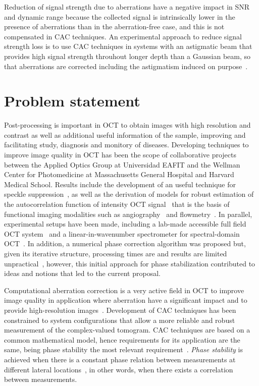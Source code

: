 Reduction of signal strength due to aberrations have a negative impact in SNR and dynamic range because the collected signal is intrinsically lower in the presence of aberrations than in the aberration-free case, and this is not compensated in CAC techniques. An experimental approach to reduce signal strength loss is to use CAC techniques in systems with an astigmatic beam that provides high signal strength throuhout longer depth than a Gaussian beam, so that aberrations are corrected including the astigmatism induced on purpose~\cite{Adie2012_Computational}.


\section{Problem statement}

Post-processing is important in OCT to obtain images with high resolution and contrast as well as additional useful information of the sample, improving and facilitating study, diagnosis and monitory of diseases. Developing techniques to improve image quality in OCT has been the scope of collaborative projects between the Applied Optics Group at Universidad EAFIT and the Wellman Center for Photomedicine at Massachusetts General Hospital and Harvard Medical School. Results include the development of an useful technique for speckle suppression~\cite{Cuartas-Velez2018_Volumetric}, as well as the derivation of models for robust estimation of the autocorrelation function of intensity OCT signal~\cite{Uribe-Patarroyo2020_Noise} that is the basis of functional imaging modalities such as angiography~\cite{Wang2007_Three} and flowmetry~\cite{Liu2013_Quantitative}. In parallel, experimental setups have been made, including a lab-made accessible full field OCT system~\cite{Cuartas-Velez2019_Labmade} and a linear-in-wavenumber spectrometer for spectral-domain OCT~\cite{Ruiz-Lopera2018_Design}. In addition, a numerical phase correction algorithm was proposed but, given its iterative structure, processing times are and results are limited unpractical~\cite{Cuartas-Velez2017_Formacion}, however, this initial approach for phase stabilization contributed to ideas and notions that led to the current proposal.

Computational aberration correction is a very active field in OCT to improve image quality in application where aberration have a significant impact and to provide high-resolution images~\cite{Adie2012_Computational, Hillmann2016_Aberrationfree, Kumar2017_Invivo}. Development of CAC techniques has been constrained to system configurations that allow a more reliable and robust measurement of the complex-valued tomogram. CAC techniques are based on a common mathematical model, hence requirements for its application are the same, being phase stability the most relevant requirement~\cite{Shemonski2014_Stability}. \textit{Phase stability} is achieved when there is a constant phase relation between measurements at different lateral locations~\cite{Shemonski2014_Stability}, in other words, when there exists a correlation between measurements.

